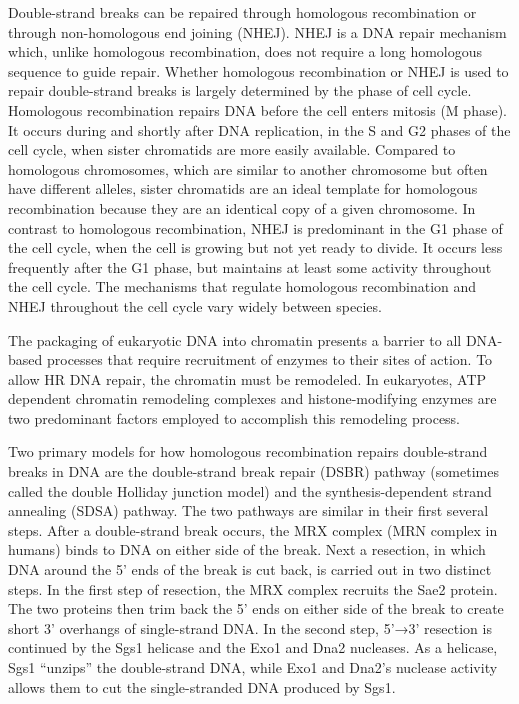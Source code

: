 Double-strand breaks can be repaired through homologous recombination or through non-homologous end joining (NHEJ). NHEJ is a DNA repair mechanism which, unlike homologous recombination, does not require a long homologous sequence to guide repair. Whether homologous recombination or NHEJ is used to repair double-strand breaks is largely determined by the phase of cell cycle. Homologous recombination repairs DNA before the cell enters mitosis (M phase). It occurs during and shortly after DNA replication, in the S and G2 phases of the cell cycle, when sister chromatids are more easily available. Compared to homologous chromosomes, which are similar to another chromosome but often have different alleles, sister chromatids are an ideal template for homologous recombination because they are an identical copy of a given chromosome. In contrast to homologous recombination, NHEJ is predominant in the G1 phase of the cell cycle, when the cell is growing but not yet ready to divide. It occurs less frequently after the G1 phase, but maintains at least some activity throughout the cell cycle. The mechanisms that regulate homologous recombination and NHEJ throughout the cell cycle vary widely between species.

The packaging of eukaryotic DNA into chromatin presents a barrier to all DNA-based processes that require recruitment of enzymes to their sites of action. To allow HR DNA repair, the chromatin must be remodeled. In eukaryotes, ATP dependent chromatin remodeling complexes and histone-modifying enzymes are two predominant factors employed to accomplish this remodeling process.

Two primary models for how homologous recombination repairs double-strand breaks in DNA are the double-strand break repair (DSBR) pathway (sometimes called the double Holliday junction model) and the synthesis-dependent strand annealing (SDSA) pathway. The two pathways are similar in their first several steps. After a double-strand break occurs, the MRX complex (MRN complex in humans) binds to DNA on either side of the break. Next a resection, in which DNA around the 5' ends of the break is cut back, is carried out in two distinct steps. In the first step of resection, the MRX complex recruits the Sae2 protein. The two proteins then trim back the 5' ends on either side of the break to create short 3' overhangs of single-strand DNA. In the second step, 5'→3' resection is continued by the Sgs1 helicase and the Exo1 and Dna2 nucleases. As a helicase, Sgs1 ``unzips'' the double-strand DNA, while Exo1 and Dna2's nuclease activity allows them to cut the single-stranded DNA produced by Sgs1.

